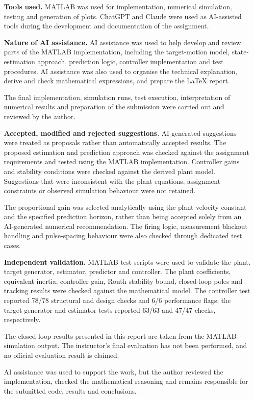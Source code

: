 \documentclass[conference]{IEEEtran}
\begin{document}
\textbf{Tools used.}
MATLAB was used for implementation, numerical simulation, testing and
generation of plots. ChatGPT and Claude were used as AI-assisted tools
during the development and documentation of the assignment.

\textbf{Nature of AI assistance.}
AI assistance was used to help develop and review parts of the MATLAB
implementation, including the target-motion model, state-estimation
approach, prediction logic, controller implementation and test
procedures. AI assistance was also used to organise the technical
explanation, derive and check mathematical expressions, and prepare
the \LaTeX{} report.

The final implementation, simulation runs, test execution, interpretation
of numerical results and preparation of the submission were carried out
and reviewed by the author.

\textbf{Accepted, modified and rejected suggestions.}
AI-generated suggestions were treated as proposals rather than
automatically accepted results. The proposed estimation and prediction
approach was checked against the assignment requirements and tested
using the MATLAB implementation. Controller gains and stability
conditions were checked against the derived plant model. Suggestions
that were inconsistent with the plant equations, assignment constraints
or observed simulation behaviour were not retained.

The proportional gain was selected analytically using the plant
velocity constant and the specified prediction horizon, rather than
being accepted solely from an AI-generated numerical recommendation.
The firing logic, measurement blackout handling and pulse-spacing
behaviour were also checked through dedicated test cases.

\textbf{Independent validation.}
MATLAB test scripts were used to validate the plant, target generator,
estimator, predictor and controller. The plant coefficients, equivalent
inertia, controller gain, Routh stability bound, closed-loop poles and
tracking results were checked against the mathematical model.
The controller test reported 78/78 structural and design checks and
6/6 performance flags; the target-generator and estimator tests
reported 63/63 and 47/47 checks, respectively.

The closed-loop results presented in this report are taken from the
MATLAB simulation output. The instructor's final evaluation has not
been performed, and no official evaluation result is claimed.

AI assistance was used to support the work, but the author reviewed
the implementation, checked the mathematical reasoning and remains
responsible for the submitted code, results and conclusions.
\end{document}
